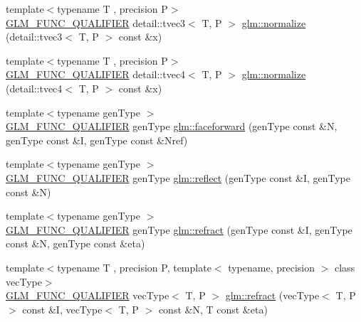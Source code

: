 \begin{DoxyCompactItemize}
\item 
{\footnotesize template$<$typename T , precision P$>$ }\\\hyperlink{setup_8hpp_a33fdea6f91c5f834105f7415e2a64407}{G\+L\+M\+\_\+\+F\+U\+N\+C\+\_\+\+Q\+U\+A\+L\+I\+F\+I\+ER} detail\+::tvec3$<$ T, P $>$ \hyperlink{namespaceglm_af238550c4974c61571d5021d1b5f94fe}{glm\+::normalize} (detail\+::tvec3$<$ T, P $>$ const \&x)
\item 
{\footnotesize template$<$typename T , precision P$>$ }\\\hyperlink{setup_8hpp_a33fdea6f91c5f834105f7415e2a64407}{G\+L\+M\+\_\+\+F\+U\+N\+C\+\_\+\+Q\+U\+A\+L\+I\+F\+I\+ER} detail\+::tvec4$<$ T, P $>$ \hyperlink{namespaceglm_a7ef6210f95347aa9bf898b789821dcdf}{glm\+::normalize} (detail\+::tvec4$<$ T, P $>$ const \&x)
\item 
{\footnotesize template$<$typename gen\+Type $>$ }\\\hyperlink{setup_8hpp_a33fdea6f91c5f834105f7415e2a64407}{G\+L\+M\+\_\+\+F\+U\+N\+C\+\_\+\+Q\+U\+A\+L\+I\+F\+I\+ER} gen\+Type \hyperlink{group__core__func__geometric_ga4bbb036ef9527ee9f67384233029ed9b}{glm\+::faceforward} (gen\+Type const \&N, gen\+Type const \&I, gen\+Type const \&Nref)
\item 
{\footnotesize template$<$typename gen\+Type $>$ }\\\hyperlink{setup_8hpp_a33fdea6f91c5f834105f7415e2a64407}{G\+L\+M\+\_\+\+F\+U\+N\+C\+\_\+\+Q\+U\+A\+L\+I\+F\+I\+ER} gen\+Type \hyperlink{group__core__func__geometric_gab63646fc36b81cf69d3ce123a72f76f2}{glm\+::reflect} (gen\+Type const \&I, gen\+Type const \&N)
\item 
{\footnotesize template$<$typename gen\+Type $>$ }\\\hyperlink{setup_8hpp_a33fdea6f91c5f834105f7415e2a64407}{G\+L\+M\+\_\+\+F\+U\+N\+C\+\_\+\+Q\+U\+A\+L\+I\+F\+I\+ER} gen\+Type \hyperlink{namespaceglm_a9aa448ae8257316d0bd2a7ba6e9f201d}{glm\+::refract} (gen\+Type const \&I, gen\+Type const \&N, gen\+Type const \&eta)
\item 
{\footnotesize template$<$typename T , precision P, template$<$ typename, precision $>$ class vec\+Type$>$ }\\\hyperlink{setup_8hpp_a33fdea6f91c5f834105f7415e2a64407}{G\+L\+M\+\_\+\+F\+U\+N\+C\+\_\+\+Q\+U\+A\+L\+I\+F\+I\+ER} vec\+Type$<$ T, P $>$ \hyperlink{group__core__func__geometric_ga99d8ddb244b129892babaca9778206d0}{glm\+::refract} (vec\+Type$<$ T, P $>$ const \&I, vec\+Type$<$ T, P $>$ const \&N, T const \&eta)
\end{DoxyCompactItemize}
